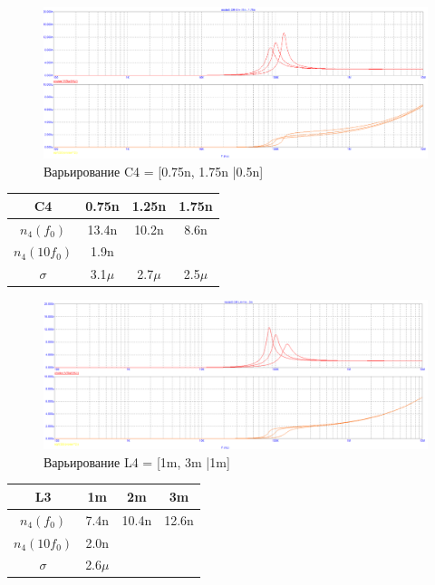 \documentclass[a4paper, 12pt]{article}%
\begin{document}
\begin{enumerate}
\begin{figure}[h!]
    \centering
    \includegraphics[scale=0.3]{images/mod3_4_2_2.png}
    \caption{Варьирование C4 = [0.75n, 1.75n |0.5n]}
    \label{fig:m3422}
\end{figure}

\begin{center}
\begin{tabular}{|c|c|c|c|}
\hline
    C4 & 0.75n & 1.25n & 1.75n\\ \hline
    $n_4(f_0)$ & 13.4n & 10.2n & 8.6n\\ \hline
    $n_4(10 f_0)$ & 1.9n &  & \\ \hline
    $\sigma$ & 3.1$\mu$ & 2.7$\mu$ & 2.5$\mu$\\ \hline
\end{tabular}
\end{center}

\begin{figure}[h!]
    \centering
    \includegraphics[scale=0.3]{images/mod3_4_2_3.png}
    \caption{Варьирование L4 = [1m, 3m |1m]}
    \label{fig:m3423}
\end{figure}

\begin{center}
\begin{tabular}{|c|c|c|c|}
\hline
    L3 & 1m & 2m & 3m\\ \hline
    $n_4(f_0)$ & 7.4n & 10.4n & 12.6n\\ \hline
    $n_4(10 f_0)$ & 2.0n &  & \\ \hline
    $\sigma$ & 2.6$\mu$ &  & \\ \hline
\end{tabular}
\end{center}

\end{enumerate}
\end{document}

